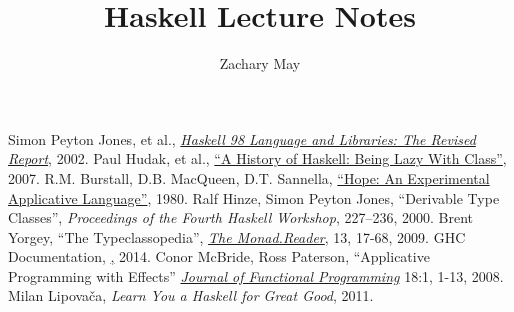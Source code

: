 \documentclass[12pt]{article}
\author{Zachary May}
\title{Haskell Lecture Notes}
\begin{document}
\maketitle










\begin{thebibliography}{99}
  Simon Peyton Jones, et al.,
  \href{http://www.haskell.org/onlinereport/index.html}{\emph{Haskell 98 Language and Libraries: The Revised Report}},
  2002.
  Paul Hudak, et al.,
  \href{http://www.scs.stanford.edu/\~dbg/readings/haskell-history.pdf}{``A History of Haskell: Being Lazy With Class''},
  2007.
  R.M. Burstall, D.B. MacQueen, D.T. Sannella,
  \href{http://homepages.inf.ed.ac.uk/dts/pub/hope.pdf}{``Hope: An Experimental Applicative Language''},
  1980.
  Ralf Hinze, Simon Peyton Jones,
  ``Derivable Type Classes'',
  \emph{Proceedings of the Fourth Haskell Workshop}, 227--236,
  2000.
  Brent Yorgey,
  ``The Typeclassopedia'',
  \href{http://www.haskell.org/wikiupload/8/85/TMR-Issue13.pdf}{\emph{The Monad.Reader}}, 13, 17-68,
  2009.
  GHC Documentation,
  \href{http://www.haskell.org/ghc/docs/7.8.3/html/},
  2014.
  Conor McBride, Ross Paterson,
  ``Applicative Programming with Effects''
  \href{}{\emph{Journal of Functional Programming}} 18:1, 1-13,
  2008.
  Milan Lipova\v{c}a,
  \emph{Learn You a Haskell for Great Good},
  2011.
\end{thebibliography}
\end{document}
